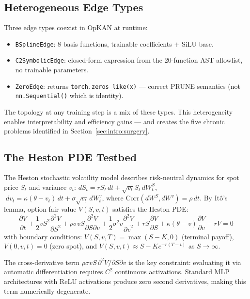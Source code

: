 \documentclass[11pt,a4paper]{article}
\begin{document}
\subsection{Heterogeneous Edge Types}
\label{sec:background:heterogeneous}

Three edge types coexist in OpKAN at runtime:
\begin{itemize}[nosep]
  \item \texttt{BSplineEdge}: 8 basis functions, trainable coefficients $+$ SiLU base.
  \item \texttt{C2SymbolicEdge}: closed-form expression from the 20-function AST
  allowlist, no trainable parameters.
  \item \texttt{ZeroEdge}: returns \texttt{torch.zeros\_like(x)} --- correct PRUNE
  semantics (not \texttt{nn.Sequential()} which is identity).
\end{itemize}

The topology at any training step is a mix of these types. This heterogeneity enables
interpretability and efficiency gains --- and creates the five chronic problems
identified in Section~\ref{sec:intro:surgery}.

\subsection{The Heston PDE Testbed}
\label{sec:background:heston}

The Heston stochastic volatility model \citep{heston1993closed} describes risk-neutral
dynamics for spot price $S_t$ and variance $v_t$:
$dS_t = r S_t \, dt + \sqrt{v_t} S_t \, dW_t^S$, $\;dv_t = \kappa(\theta - v_t) \, dt + \sigma \sqrt{v_t} \, dW_t^v$,
where $\text{Corr}(dW^S, dW^v) = \rho \, dt$. By It\^o's lemma, option fair value
$V(S,v,t)$ satisfies the Heston PDE:
\begin{equation}
\frac{\partial V}{\partial t}
+ \frac{1}{2}vS^2\frac{\partial^2 V}{\partial S^2}
+ \rho\sigma vS\frac{\partial^2 V}{\partial S\partial v}
+ \frac{1}{2}\sigma^2 v\frac{\partial^2 V}{{\partial v}^2}
+ rS\frac{\partial V}{\partial S}
+ \kappa(\theta-v)\frac{\partial V}{\partial v}
- rV = 0
\label{eq:heston_pde}
\end{equation}
with boundary conditions:
$V(S, v, T) = \max(S - K, 0)$ (terminal payoff),
$V(0, v, t) = 0$ (zero spot), and
$V(S, v, t) \approx S - Ke^{-r(T-t)}$ as $S \to \infty$.

The cross-derivative term $\rho\sigma vS \,\partial^2 V / \partial S \partial v$ is
the key constraint: evaluating it via automatic differentiation requires $C^2$
continuous activations. Standard MLP architectures with ReLU activations produce
zero second derivatives, making this term numerically degenerate.
\end{document}
